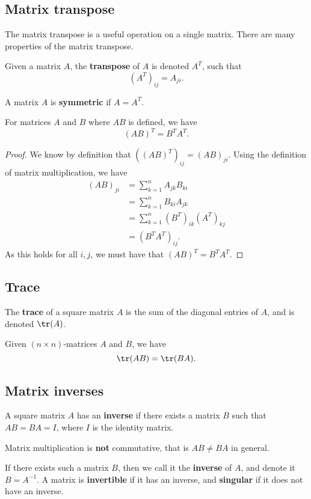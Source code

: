 \subsection{Matrix transpose}
The matrix transpose is a useful operation on a single matrix. There are many properties of the matrix transpose.
\begin{definition}
  Given a matrix $A$, the \textbf{transpose} of $A$ is denoted $A^T$, such that \[
    (A^T)_{ij} = A_{ji}
  .\] 
\end{definition}
\begin{definition}
  A matrix $A$ is \textbf{symmetric} if $A = A^T$.
\end{definition}
\begin{theorem}
  For matrices $A$ and $B$ where $AB$ is defined, we have  \[
    (AB)^T = B^TA^T
  .\] 
\end{theorem}
\begin{proof}
  We know by definition that $((AB)^T)_{ij} = (AB)_{ji}$. Using the definition of matrix multiplication, we have 
  \begin{align*}
    (AB)_{ji} &= \sum_{k = 1}^{n} A_{jk}B_{ki} \\
              &= \sum_{k=1}^{n} B_{ki}A_{jk} \\
              &= \sum_{k=1}^{n} (B^T)_{ik}(A^T)_{kj} \\
              &= (B^TA^T)_{ij}.
  \end{align*}
  As this holds for all $i, j$, we must have that $(AB)^T = B^TA^T$.
\end{proof}
\subsection{Trace}
The \textbf{trace} of a square matrix $A$ is the sum of the diagonal entries of $A$, and is denoted $\tr(A)$.
\begin{theorem}
  Given $(n\times n)$-matrices $A$ and $B$, we have \[
    \tr(AB) = \tr(BA)
  .\] 
\end{theorem}
\subsection{Matrix inverses}
A square matrix $A$ has an \textbf{inverse} if there exists a matrix $B$ such that $AB = BA = I$, where $I$ is the identity matrix.
\begin{remark}
  Matrix multiplication is \textbf{not} commutative, that is $AB \neq BA$ in general.
\end{remark}
If there exists such a matrix $B$, then we call it the \textbf{inverse} of $A$, and denote it $B = A^{-1}$. A matrix is \textbf{invertible} if it has an inverse, and \textbf{singular} if it does not have an inverse.

